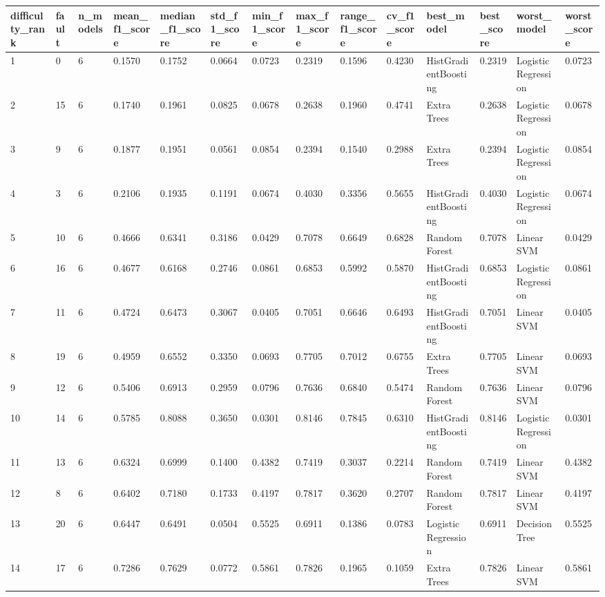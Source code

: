 \begin{tabular}{llllllllllllll}
\toprule
difficulty\_rank & fault & n\_models & mean\_f1\_score & median\_f1\_score & std\_f1\_score & min\_f1\_score & max\_f1\_score & range\_f1\_score & cv\_f1\_score & best\_model & best\_score & worst\_model & worst\_score \\
\midrule
1 & 0 & 6 & 0.1570 & 0.1752 & 0.0664 & 0.0723 & 0.2319 & 0.1596 & 0.4230 & HistGradientBoosting & 0.2319 & Logistic Regression & 0.0723 \\
2 & 15 & 6 & 0.1740 & 0.1961 & 0.0825 & 0.0678 & 0.2638 & 0.1960 & 0.4741 & Extra Trees & 0.2638 & Logistic Regression & 0.0678 \\
3 & 9 & 6 & 0.1877 & 0.1951 & 0.0561 & 0.0854 & 0.2394 & 0.1540 & 0.2988 & Extra Trees & 0.2394 & Logistic Regression & 0.0854 \\
4 & 3 & 6 & 0.2106 & 0.1935 & 0.1191 & 0.0674 & 0.4030 & 0.3356 & 0.5655 & HistGradientBoosting & 0.4030 & Logistic Regression & 0.0674 \\
5 & 10 & 6 & 0.4666 & 0.6341 & 0.3186 & 0.0429 & 0.7078 & 0.6649 & 0.6828 & Random Forest & 0.7078 & Linear SVM & 0.0429 \\
6 & 16 & 6 & 0.4677 & 0.6168 & 0.2746 & 0.0861 & 0.6853 & 0.5992 & 0.5870 & HistGradientBoosting & 0.6853 & Logistic Regression & 0.0861 \\
7 & 11 & 6 & 0.4724 & 0.6473 & 0.3067 & 0.0405 & 0.7051 & 0.6646 & 0.6493 & HistGradientBoosting & 0.7051 & Linear SVM & 0.0405 \\
8 & 19 & 6 & 0.4959 & 0.6552 & 0.3350 & 0.0693 & 0.7705 & 0.7012 & 0.6755 & Extra Trees & 0.7705 & Linear SVM & 0.0693 \\
9 & 12 & 6 & 0.5406 & 0.6913 & 0.2959 & 0.0796 & 0.7636 & 0.6840 & 0.5474 & Random Forest & 0.7636 & Linear SVM & 0.0796 \\
10 & 14 & 6 & 0.5785 & 0.8088 & 0.3650 & 0.0301 & 0.8146 & 0.7845 & 0.6310 & HistGradientBoosting & 0.8146 & Logistic Regression & 0.0301 \\
11 & 13 & 6 & 0.6324 & 0.6999 & 0.1400 & 0.4382 & 0.7419 & 0.3037 & 0.2214 & Random Forest & 0.7419 & Linear SVM & 0.4382 \\
12 & 8 & 6 & 0.6402 & 0.7180 & 0.1733 & 0.4197 & 0.7817 & 0.3620 & 0.2707 & Random Forest & 0.7817 & Linear SVM & 0.4197 \\
13 & 20 & 6 & 0.6447 & 0.6491 & 0.0504 & 0.5525 & 0.6911 & 0.1386 & 0.0783 & Logistic Regression & 0.6911 & Decision Tree & 0.5525 \\
14 & 17 & 6 & 0.7286 & 0.7629 & 0.0772 & 0.5861 & 0.7826 & 0.1965 & 0.1059 & Extra Trees & 0.7826 & Linear SVM & 0.5861 \\

\end{tabular}
